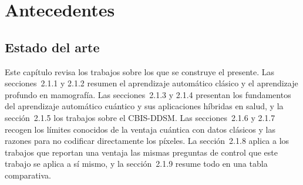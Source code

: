 
\section{Antecedentes}
\label{sec:antecedentes}

\subsection{Estado del arte}

Este capítulo revisa los trabajos sobre los que se construye el presente. Las secciones~2.1.1 y 2.1.2 resumen el aprendizaje automático clásico y el aprendizaje profundo en mamografía. Las secciones~2.1.3 y 2.1.4 presentan los fundamentos del aprendizaje automático cuántico y sus aplicaciones híbridas en salud, y la sección~2.1.5 los trabajos sobre el CBIS-DDSM. Las secciones~2.1.6 y 2.1.7 recogen los límites conocidos de la ventaja cuántica con datos clásicos y las razones para no codificar directamente los píxeles. La sección~2.1.8 aplica a los trabajos que reportan una ventaja las mismas preguntas de control que este trabajo se aplica a sí mismo, y la sección~2.1.9 resume todo en una tabla comparativa.
